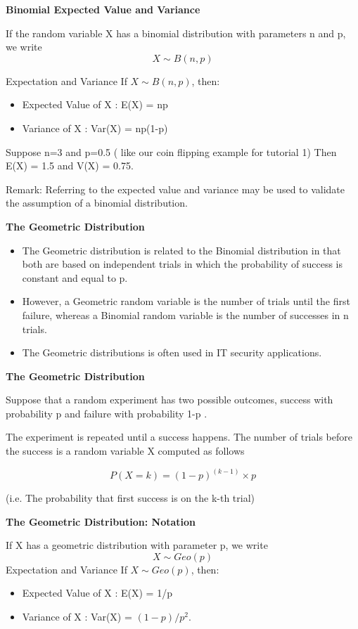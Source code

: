 \documentclass[a4]{beamer}
\begin{document}
{
\textbf{Binomial Expected Value and Variance}


If the random variable X has a binomial distribution with parameters n
and p, we write
\[ X \sim B(n,p) \]

Expectation and Variance
If $X \sim B(n,p)$, then:

\begin{itemize}
\item Expected Value of X : E(X) = np
\item Variance of X : Var(X) = np(1-p)
\end{itemize}

Suppose n=3 and p=0.5 ( like our coin flipping example for tutorial 1)
Then E(X) = 1.5 and V(X) = 0.75.

Remark: Referring to the expected value and variance may be used to validate
the assumption of a binomial distribution.

}
{
\textbf{The Geometric Distribution}
\begin{itemize}
\item The Geometric distribution is related to the Binomial distribution in that
both are based on independent trials in which the probability of success
is constant and equal to p.
\item However, a Geometric random variable is the number of trials until the
first failure, whereas a Binomial random variable is the number of
successes in n trials.
\item The Geometric distributions is often used in IT security applications.
\end{itemize}
}
{
\textbf{The Geometric Distribution}

Suppose that a random experiment has two possible outcomes, success
with probability p and failure with probability 1-p .


The experiment is repeated until a success happens. The number of
trials before the success is a random variable X computed as follows

\[P(X = k) = (1-p)^{(k-1)}\times p \]


(i.e. The probability that first success is on the k-th trial)
}


{
\textbf{The Geometric Distribution: Notation}

If X has a geometric distribution with parameter p, we write
\[X \sim Geo(p) \]
Expectation and Variance
If $X \sim Geo(p)$, then:

\begin{itemize}
\item Expected Value of X : E(X) = 1/p
\item Variance of X : Var(X) = $(1-p)/p^2$.
\end{itemize}
}
\end{document}
